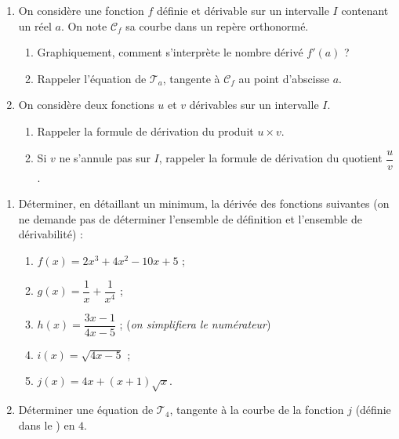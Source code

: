 \documentclass[a4paper,11pt]{article}
\begin{document}
\begin{enumerate}
	\item On considère une fonction $f$ définie et dérivable sur un intervalle $I$ contenant un réel $a$. On note $\mathscr{C}_f$ sa courbe dans un repère orthonormé.
	\begin{enumerate}
		\item Graphiquement, comment s'interprète le nombre dérivé $f'(a)$ ?
		\item Rappeler l'équation de $\mathscr{T}_a$, tangente à $\mathscr{C}_f$ au point d'abscisse $a$.
	\end{enumerate}
	\item On considère deux fonctions $u$ et $v$ dérivables sur un intervalle $I$.
	\begin{enumerate}
		\item Rappeler la formule de dérivation du produit $u \times v$.
		\item Si $v$ ne s'annule pas sur $I$, rappeler la formule de dérivation du quotient $\dfrac{u}{v}$.
	\end{enumerate}
\end{enumerate}

\smallskip


\begin{enumerate}
	\item Déterminer, en détaillant un minimum, la dérivée des fonctions suivantes (on ne demande pas de déterminer l'ensemble de définition et l'ensemble de dérivabilité) :
	\begin{enumerate}
		\item $f(x)=2x^3+4x^2-10x+5$ ;
		\item $g(x)=\dfrac{1}{x}+\dfrac{1}{x^4}$ ;
		\item $h(x)=\dfrac{3x-1}{4x-5}$ ; \hfill(\textit{on simplifiera le numérateur})
		\item $i(x)=\sqrt{4x-5}$ ;
		\item $j(x)=4x+(x+1)\sqrt{x}$.
	\end{enumerate}
	\item Déterminer une équation de $\mathscr{T}_{4}$, tangente à la courbe de la fonction $j$ (définie dans le ) en $4$.
\end{enumerate}

\smallskip

\end{document}
